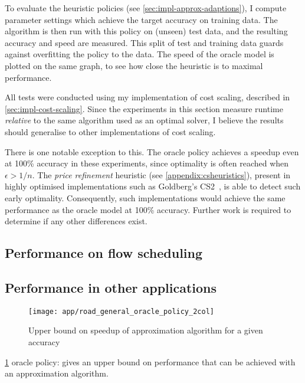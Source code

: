 To evaluate the heuristic policies (see \cref{sec:impl-approx-adaptions}), I compute parameter settings which achieve the target accuracy on training data. The algorithm is then run with this policy on (unseen) test data, and the resulting accuracy and speed are measured. This split of test and training data guards against overfitting the policy to the data. The speed of the oracle model is plotted on the same graph, to see how close the heuristic is to maximal performance.

All tests were conducted using my implementation of cost scaling, described in \cref{sec:impl-cost-scaling}. Since the experiments in this section measure runtime \emph{relative} to the same algorithm used as an optimal solver, I believe the results should generalise to other implementations of cost scaling. 

There is one notable exception to this. The oracle policy achieves a speedup even at 100\% accuracy in these experiments, since optimality is often reached when $\epsilon > 1/n$. The \emph{price refinement} heuristic (see \cref{appendix:csheuristics}), present in highly optimised implementations such as Goldberg's CS2~\cite{CS2:2009}, is able to detect such early optimality. Consequently, such implementations would achieve the same performance as the oracle model at 100\% accuracy. Further work is required to determine if any other differences exist.


\subsection{Performance on flow scheduling}

\subsection{Performance in other applications}

\begin{figure}
    \centering
    \texttt{[image: app/road\_general\_oracle\_policy\_2col]}
    \caption{Upper bound on speedup of approximation algorithm for a given accuracy}
    \label{fig:app-oracle-policy}
\end{figure}

\cref{fig:app-oracle-policy} oracle policy: gives an upper bound on performance that can be achieved with an approximation algorithm.

